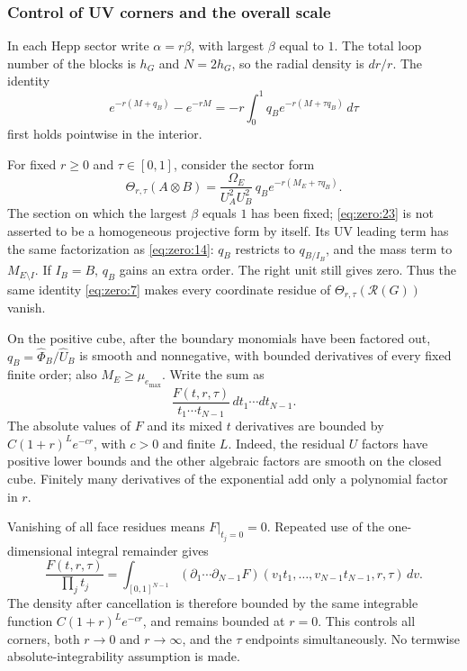 \documentclass[11pt,a4paper,oneside]{article}
\theoremstyle{plain}
\theoremstyle{definition}
\theoremstyle{remark}
\numberwithin{equation}{section}
\begin{document}
\subsubsection{Control of UV corners and the overall scale}\label{sec:zero:8.2}
In each Hepp sector write \(\alpha=r\beta\), with largest \(\beta\) equal to $1$. The total loop number of the blocks is \(h_G\) and \(N=2h_G\), so the radial density is $dr/r$. The identity
\begin{equation}
e^{-r(M+q_B)}-e^{-rM}
      =-r\int_0^1q_Be^{-r(M+\tau q_B)}\,d\tau                 \label{eq:zero:22}
\end{equation}
first holds pointwise in the interior.

For fixed \(r\geq0\) and \(\tau\in[0,1]\), consider the sector form
\begin{equation}
\Theta_{r,\tau}(A\otimes B)
   =\frac{\Omega_E}{U_A^2U_B^2}\,
                         q_Be^{-r(M_E+\tau q_B)}.             \label{eq:zero:23}
\end{equation}
The section on which the largest \(\beta\) equals $1$ has been fixed; \eqref{eq:zero:23} is not asserted to be a homogeneous projective form by itself. Its UV leading term has the same factorization as \eqref{eq:zero:14}: \(q_B\) restricts to \(q_{B/I_B}\), and the mass term to \(M_{E\setminus I}\). If \(I_B=B\), \(q_B\) gains an extra order. The right unit still gives zero. Thus the same identity \eqref{eq:zero:7} makes every coordinate residue of \(\Theta_{r,\tau}(\mathcal R(G))\) vanish.

On the positive cube, after the boundary monomials have been factored out, \(q_B=\widehat\Phi_B/\widehat U_B\) is smooth and nonnegative, with bounded derivatives of every fixed finite order; also \(M_E\geq\mu_{e_{\mathrm{max}}}\). Write the sum as
\begin{equation}
\frac{F(t,r,\tau)}{t_1\cdots t_{N-1}}\,
                      dt_1\cdots dt_{N-1}.
\end{equation}
The absolute values of $F$ and its mixed $t$ derivatives are bounded by \(C(1+r)^L e^{-cr}\), with \(c>0\) and finite $L$. Indeed, the residual $U$ factors have positive lower bounds and the other algebraic factors are smooth on the closed cube. Finitely many derivatives of the exponential add only a polynomial factor in $r$.

Vanishing of all face residues means \(F|_{t_j=0}=0\). Repeated use of the one-dimensional integral remainder gives
\begin{equation}
\frac{F(t,r,\tau)}{\prod_jt_j}
 =\int_{[0,1]^{N-1}}
   (\partial_1\cdots\partial_{N-1}F)
              (v_1t_1,\ldots,v_{N-1}t_{N-1},r,\tau)\,dv.     \label{eq:zero:24}
\end{equation}
The density after cancellation is therefore bounded by the same integrable function \(C(1+r)^L e^{-cr}\), and remains bounded at \(r=0\). This controls all corners, both \(r\to0\) and \(r\to\infty\), and the \(\tau\) endpoints simultaneously. No termwise absolute-integrability assumption is made.
\end{document}
